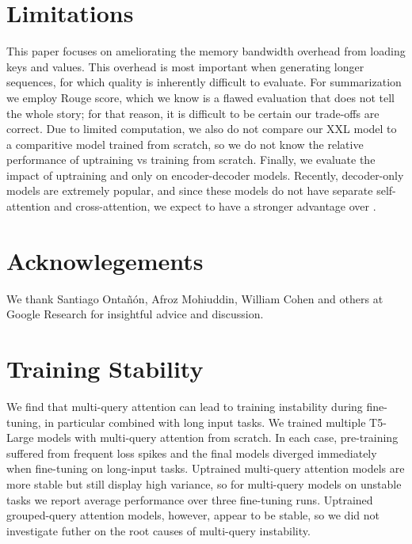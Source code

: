 \documentclass[11pt]{article}
\begin{document}
\section*{Limitations}

This paper focuses on ameliorating the memory bandwidth overhead from loading keys and values. This overhead is most important when generating longer sequences, for which quality is inherently difficult to evaluate. For summarization we employ Rouge score, which we know is a flawed evaluation that does not tell the whole story; for that reason, it is difficult to be certain our trade-offs are correct. Due to limited computation, we also do not compare our XXL \gmq model to a comparitive model trained from scratch, so we do not know the relative performance of uptraining vs training from scratch. Finally, we evaluate the impact of uptraining and \gmq only on encoder-decoder models. Recently, decoder-only models are extremely popular, and since these models do not have separate self-attention and cross-attention, we expect \gmq to have a stronger advantage over \mq.


\section*{Acknowlegements}
We thank Santiago Onta\~{n}\'{o}n, Afroz Mohiuddin, William Cohen and others at Google Research for insightful advice and discussion. 





\clearpage
\appendix

\section{Training Stability}

We find that multi-query attention can lead to training instability during fine-tuning, in particular combined with long input tasks. We trained multiple T5-Large models with multi-query attention from scratch. In each case, pre-training suffered from frequent loss spikes and the final models diverged immediately when fine-tuning on long-input tasks. Uptrained multi-query attention models are more stable but still display high variance, so for multi-query models on unstable tasks we report average performance over three fine-tuning runs. Uptrained grouped-query attention models, however, appear to be stable, so we did not investigate futher on the root causes of multi-query instability.
\end{document}
